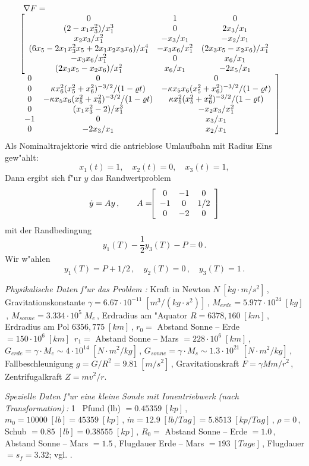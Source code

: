 \documentclass[12pt,a4paper,twoside,leqno]{article}
\begin{document}
\[
\ba{.}{l}
\nabla F = \\
\ba{[}{ccc}
0                      & 1           & 0\\
(2 -x_1x_3^2)/x_1^3 & 0           & 2x_3/x_1\\
x_2x_3/x_1^2        & -x_3/x_1 & - x_2/x_1\\
(6x_5-2x_1x_3^2x_5+ 2x_1x_2x_3x_6)/x_1^4
& -x_3x_6/x_1^2
& (2x_3x_5 - x_2x_6)/x_1^2\\
-x_3x_6/x_1^2 & 0 & x_6/x_1\\
(2x_3x_5 - x_2x_6)/x_1^2 & x_6/x_1 & -2x_5/x_1\\
\ea{.}  \\[8mm]
  \ba{.}{ccc}
0  & 0 & 0\\
0  & \kappa x_6^2(x_5^2 + x_6^2)^{-3/2}/(1-\rho t)
   & -\kappa x_5x_6(x_5^2 + x_6^2)^{-3/2}/(1-\rho t)\\
0  & -\kappa x_5x_6(x_5^2 + x_6^2)^{-3/2}/(1-\rho t)
   &  \kappa x_5^2(x_5^2 + x_6^2)^{-3/2}/(1-\rho t)\\
0  & (x_1x_3^2 - 2)/x_1^3 & - x_2x_3/x_1^2\\
-1 & 0 & x_3/x_1\\
 0 & -2x_3/x_1 & x_2/x_1
\ea{]}
\ea{.}
\]
%
Als Nominaltrajektorie wird die antrieblose Umlaufbahn mit Radius Eins
gew"ahlt:
%
\[
x_1(t) = 1, \quad x_2(t) = 0, \quad x_3(t) = 1,
\]
%
Dann ergibt sich f"ur $y$ das Randwertproblem
%
\[
\dot{y} = Ay\,, \qquad
A = \ba{[}{ccc} 0 & -1 & 0\\ -1 & 0 & 1/2\\ 0 & -2 & 0\ea{]}
\]
mit der Randbedingung
\[
y_1(T) - \frac12 y_3(T) - P = 0\,.
\]
Wir w"ahlen
\[
y_1(T) = P + 1/2\,, \quad y_2(T) = 0\,, \quad y_3(T) = 1\,.
\]

{\em Physikalische Daten f"ur das Problem :}
Kraft in Newton $N \; [kg \cdot m/s^2]$\,,
Gravitationskonstante $\gamma  = 6.67\cdot 10^{-11} \; [m^3/(kg\cdot s^2)]$\,,
$M_{erde}  = 5.977 \cdot 10^{24}\; [kg]$\,,
$M_{sonne} = 3.334 \cdot 10^5 \; M_e$\,,
Erdradius am "Aquator $R = 6378,160 \; [km]$\,,
Erdradius am Pol  $6356,775 \; [km]$\,,
$r_0 =$ Abstand Sonne -- Erde $= 150\cdot 10^6 \; [km]$\,
$r_1 =$ Abstand Sonne -- Mars $= 228\cdot 10^6 \; [km]$\,,
$G_{erde} = \gamma\cdot M_e \sim 4 \cdot 10^{14} \; [N\cdot m^2/kg]$\,,
$G_{sonne} = \gamma\cdot M_s \sim 1.3 \cdot 10^{21} \; [N\cdot m^2/kg]$\,,
Fallbeschleunigung  $g = G/R^2  = 9.81 \; [m/s^2]$\,,
Gravitationskraft   $F = \gamma  M m/r^2$\,,
Zentrifugalkraft    $Z = m v^2/r$.
\par
{\em Spezielle Daten f"ur eine kleine Sonde mit Ionentriebwerk (nach
Transformation)\,:}
1 \ Pfund (lb) $= 0.45359 \; [kp]$\,,
$m_0 = 10 000 \; [lb] = 45359 \; [kp]$\,,
$\dot{m} =  12.9 \; [lb/Tag] =  5.8513 \; [kp/Tag]$\,,
$\rho = 0$\,,
Schub $= 0.85 \; [lb] = 0.38555 \; [kp]$\,,
$R_0 =$ Abstand Sonne -- Erde   $= 1.0$\,,
Abstand Sonne -- Mars $= 1.5$\,,
Flugdauer Erde -- Mars $= 193 \; [Tage]$\,,
Flugdauer $ = s_f = 3.32$; vgl. \cite{Bryson}.
\end{document}
